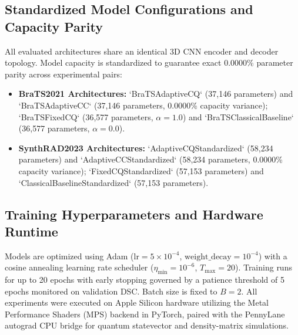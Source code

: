 \subsection{Standardized Model Configurations and Capacity Parity}
All evaluated architectures share an identical 3D CNN encoder and decoder topology. 
Model capacity is standardized to guarantee exact 0.0000\% parameter parity across experimental pairs:
\begin{itemize}
    \item \textbf{BraTS2021 Architectures:} `BraTSAdaptiveCQ` (37,146 parameters) and `BraTSAdaptiveCC` (37,146 parameters, 0.0000\% capacity variance); `BraTSFixedCQ` (36,577 parameters, $\alpha=1.0$) and `BraTSClassicalBaseline` (36,577 parameters, $\alpha=0.0$).
    \item \textbf{SynthRAD2023 Architectures:} `AdaptiveCQStandardized` (58,234 parameters) and `AdaptiveCCStandardized` (58,234 parameters, 0.0000\% capacity variance); `FixedCQStandardized` (57,153 parameters) and `ClassicalBaselineStandardized` (57,153 parameters).
\end{itemize}

\subsection{Training Hyperparameters and Hardware Runtime}
Models are optimized using Adam ($\text{lr} = 5 \times 10^{-4}$, $\text{weight\_decay} = 10^{-4}$) with a cosine annealing learning rate scheduler ($\eta_{\min} = 10^{-6}$, $T_{\max} = 20$). 
Training runs for up to 20 epochs with early stopping governed by a patience threshold of 5 epochs monitored on validation DSC. 
Batch size is fixed to $B=2$. 
All experiments were executed on Apple Silicon hardware utilizing the Metal Performance Shaders (MPS) backend in PyTorch, paired with the PennyLane autograd CPU bridge for quantum statevector and density-matrix simulations.
